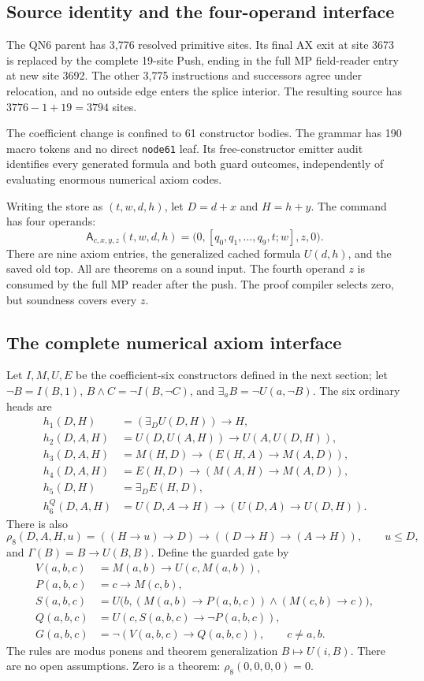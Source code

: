 \documentclass[10pt,letterpaper]{article}
\begin{document}
\subsection{Source identity and the four-operand interface}

The QN6 parent has 3,776 resolved primitive sites. Its final AX exit at
site 3673 is replaced by the complete 19-site Push, ending in the full MP
field-reader entry at new site 3692. The other 3,775 instructions and
successors agree under relocation, and no outside edge enters the
splice interior. The resulting source has $3776-1+19=3794$ sites.

The coefficient change is confined to 61 constructor bodies. The grammar
has 190 macro tokens and no direct \texttt{node61} leaf. Its free-constructor
emitter audit identifies every generated formula and both guard outcomes,
independently of evaluating enormous numerical axiom codes.

Writing the store as $(t,w,d,h)$, let $D=d+x$ and $H=h+y$.
The command has four operands:
\[
 \mathsf A_{c,x,y,z}(t,w,d,h)
 =\bigl(0,[q_0,q_1,\ldots,q_9,t;w],z,0\bigr).
\]
There are nine axiom entries, the generalized cached formula $U(d,h)$,
and the saved old top. All are theorems on a sound input. The fourth
operand $z$ is consumed by the full MP reader after the push.
The proof compiler selects zero, but soundness covers every $z$.

\subsection{The complete numerical axiom interface}

Let $I,M,U,E$ be the coefficient-six constructors defined in the next
section; let $\neg B=I(B,1)$,
$B\wedge C=\neg I(B,\neg C)$, and $\exists_a B=\neg U(a,\neg B)$.
The six ordinary heads are
\begin{align*}
 h_1(D,H)&=(\exists_D U(D,H))\to H,\\
 h_2(D,A,H)&=U(D,U(A,H))\to U(A,U(D,H)),\\
 h_3(D,A,H)&=M(H,D)\to(E(H,A)\to M(A,D)),\\
 h_4(D,A,H)&=E(H,D)\to(M(A,H)\to M(A,D)),\\
 h_5(D,H)&=\exists_D E(H,D),\\
 h_6^Q(D,A,H)&=U(D,A\to H)\to(U(D,A)\to U(D,H)).
\end{align*}
There is also
\[
 \rho_8(D,A,H,u)=((H\to u)\to D)\to((D\to H)\to(A\to H)),
 \qquad u\le D,
\]
and $\Gamma(B)=B\to U(B,B)$. Define the guarded gate by
\begin{align*}
 V(a,b,c)&=M(a,b)\to U(c,M(a,b)),\\
 P(a,b,c)&=c\to M(c,b),\\
 S(a,b,c)&=U\bigl(b,(M(a,b)\to P(a,b,c))\wedge(M(c,b)\to c)\bigr),\\
 Q(a,b,c)&=U(c,S(a,b,c)\to\neg P(a,b,c)),\\
 G(a,b,c)&=\neg(V(a,b,c)\to Q(a,b,c)),\qquad c\ne a,b.
\end{align*}
The rules are modus ponens and theorem generalization
$B\mapsto U(i,B)$. There are no open assumptions.
Zero is a theorem: $\rho_8(0,0,0,0)=0$.
\end{document}
